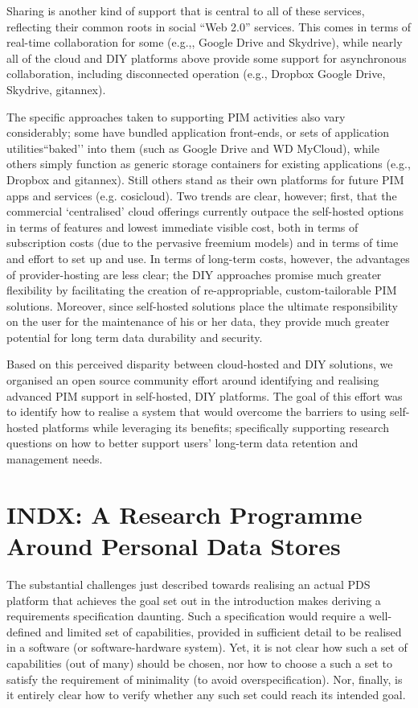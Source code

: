 \documentclass[graybox]{svmult}
\begin{document}
Sharing is another kind of support that is central to all of these services, reflecting their common roots in social “Web 2.0”  services.  This comes in terms of real-time collaboration for some (e.g.,, Google Drive and Skydrive), while nearly all of the cloud and DIY platforms above  provide some support for asynchronous collaboration, including disconnected operation (e.g., Dropbox Google Drive, Skydrive, gitannex).

The specific approaches taken to supporting PIM activities also vary considerably; some have bundled application front-ends, or sets of application utilities``baked’’ into them (such as Google Drive and WD MyCloud), while others simply function as generic storage containers for existing applications (e.g., Dropbox and gitannex).  Still others stand  as their own platforms for future PIM apps and services (e.g. cosicloud).  Two trends are clear, however; first, that the commercial ‘centralised’ cloud offerings currently outpace the self-hosted options in terms of features and lowest immediate visible cost, both in terms of subscription costs (due to the pervasive freemium models) and in terms of time and effort to set up and use.  In terms of long-term costs, however, the advantages of provider-hosting are less clear; the DIY approaches promise much greater flexibility by facilitating the creation of re-appropriable, custom-tailorable PIM solutions.  Moreover, since self-hosted solutions place the ultimate responsibility on the user for the maintenance of his or her data, they provide much greater potential for long term data durability and security.  

Based on this perceived disparity between cloud-hosted and DIY solutions, we organised an open source community effort around identifying and realising advanced PIM support in self-hosted, DIY platforms.  The goal of this effort was to identify how to realise a system that would overcome the barriers to using self-hosted platforms while leveraging its benefits; specifically supporting research questions on how to better support users’ long-term data retention and management needs.

\section{INDX: A Research Programme Around Personal Data Stores}

The substantial challenges just described towards realising an actual PDS platform that achieves the goal set out in the introduction makes deriving a requirements specification daunting.  Such a specification would require a well-defined and limited set of capabilities, provided in sufficient detail to be realised in a software (or software-hardware system).  Yet, it is not clear how such a set of capabilities (out of many) should be chosen, nor how to choose a such a set to satisfy the requirement of minimality (to avoid overspecification).  Nor, finally, is it entirely clear how to verify whether any such set could reach its intended goal.
\end{document}
